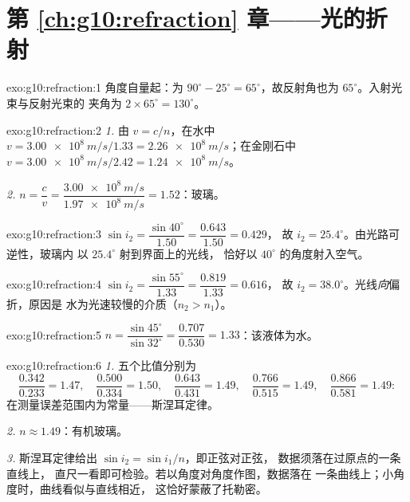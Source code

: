 \section*{第 \ref{ch:g10:refraction} 章——光的折射}

\begin{solution}{exo:g10:refraction:1}
角度自量起：为
$90^\circ - 25^\circ = 65^\circ$，故反射角也为
$65^\circ$。入射光束与反射光束的
夹角为 $2 \times 65^\circ = 130^\circ$。
\end{solution}

\begin{solution}{exo:g10:refraction:2}
\emph{1.} 由 $v = c/n$，在水中
$v = \qty{3.00e8}{m/s}/1.33 = \qty{2.26e8}{m/s}$；在金刚石中
$v = \qty{3.00e8}{m/s}/2.42 = \qty{1.24e8}{m/s}$。

\emph{2.} $n = \dfrac{c}{v} = \dfrac{\qty{3.00e8}{m/s}}
{\qty{1.97e8}{m/s}} = 1.52$：玻璃。
\end{solution}

\begin{solution}{exo:g10:refraction:3}
$\sin i_2 = \dfrac{\sin 40^\circ}{1.50} = \dfrac{0.643}{1.50} = 0.429$，
故 $i_2 = 25.4^\circ$。由光路可逆性，玻璃内
以 $25.4^\circ$ 射到界面上的光线，
恰好以 $40^\circ$ 的角度射入空气。
\end{solution}

\begin{solution}{exo:g10:refraction:4}
$\sin i_2 = \dfrac{\sin 55^\circ}{1.33} = \dfrac{0.819}{1.33} = 0.616$，
故 $i_2 = 38.0^\circ$。光线\emph{向}偏折，原因是
水为光速较慢的介质（$n_2 > n_1$）。
\end{solution}

\begin{solution}{exo:g10:refraction:5}
$n = \dfrac{\sin 45^\circ}{\sin 32^\circ} = \dfrac{0.707}{0.530}
= 1.33$：该液体为水。
\end{solution}

\begin{solution}{exo:g10:refraction:6}
\emph{1.} 五个比值分别为
\[
\frac{0.342}{0.233} = 1.47,\quad
\frac{0.500}{0.334} = 1.50,\quad
\frac{0.643}{0.431} = 1.49,\quad
\frac{0.766}{0.515} = 1.49,\quad
\frac{0.866}{0.581} = 1.49 :
\]
在测量误差范围内为常量——斯涅耳定律。

\emph{2.} $n \approx 1.49$：有机玻璃。

\emph{3.} 斯涅耳定律给出 $\sin i_2 = \sin i_1 / n$，即正弦对正弦，
数据须落在过原点的一条直线上，
直尺一看即可检验。若以角度对角度作图，数据落在
一条曲线上；小角度时，曲线看似与直线相近，
这恰好蒙蔽了托勒密。
\end{solution}

